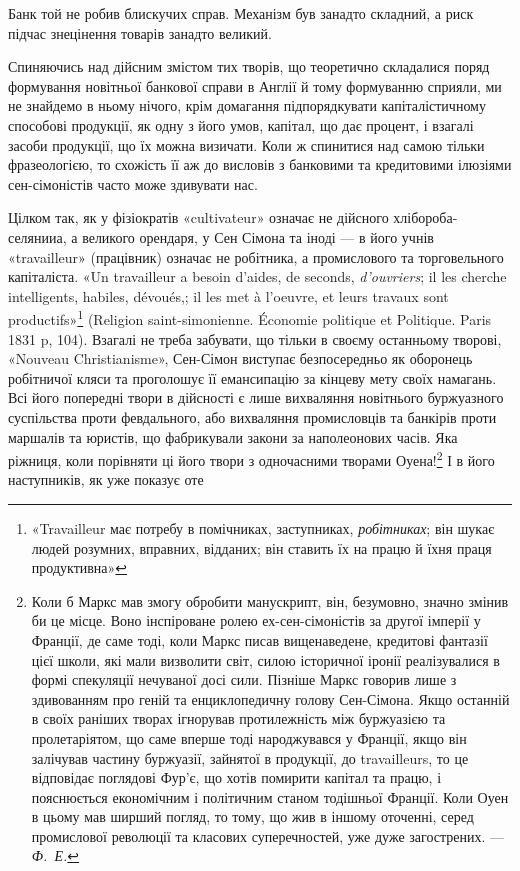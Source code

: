 \parcont{}  %
Банк той не робив блискучих справ. Механізм був занадто складний, а риск
підчас знецінення товарів занадто великий.

Спиняючись над дійсним змістом тих творів, що теоретично складалися
поряд формування новітньої банкової справи в Англії й тому формуванню
сприяли, ми не знайдемо в ньому нічого, крім домагання підпорядкувати
капіталістичному способові продукції, як одну з його умов, капітал, що дає процент,
і взагалі засоби продукції, що їх можна визичати. Коли ж спинитися над
самою тільки фразеологією, то схожість її аж до висловів з банковими та кредитовими
ілюзіями сен-сімоністів часто може здивувати нас.

Цілком так, як у фізіократів «cultivateur» означає не дійсного хлібороба-селянииа,
а великого орендаря, у Сен Сімона та іноді — в його учнів «travailleur»
(працівник) означає не робітника, а промислового та торговельного капіталіста.
«Un travailleur a besoin d’aides, de seconds, \emph{d'ouvriers}; il les cherche
intelligents, habiles, dévoués,; il les met à l’oeuvre, et leurs travaux sont productifs»\footnote*{
«Travailleur має потребу в помічниках, заступниках, \emph{робітниках}; він шукає людей розумних,
вправних, відданих; він ставить їх на працю й їхня праця продуктивна» 
}
(Religion saint-simonienne. Économie politique et Politique. Paris 1831 p, 104). Взагалі
не треба забувати, що тільки в своєму останньому творові, «Nouveau Christianisme»,
Сен-Сімон виступає безпосередньо як оборонець робітничої кляси та
проголошує її емансипацію за кінцеву мету своїх намагань. Всі його попередні
твори в дійсності є лише вихваляння новітнього буржуазного суспільства проти
февдального, або вихваляння промисловців та банкірів проти маршалів та юристів,
що фабрикували закони за наполеонових часів. Яка ріжниця, коли порівняти ці його
твори з одночасними творами Оуена!\footnote{
Коли б Маркс мав змогу обробити манускрипт, він, безумовно, значно змінив би це місце.
Воно інспіроване ролею ех-сен-сімоністів за другої імперії у Франції, де саме тоді, коли Маркс
писав вищенаведене, кредитові фантазії цієї школи, які мали визволити світ, силою історичної
іронії реалізувалися в формі спекуляції нечуваної досі сили. Пізніше Маркс говорив лише з
здивованням
про геній та енциклопедичну голову Сен-Сімона. Якщо останній в своїх раніших творах ігнорував
протилежність між буржуазією та пролетаріятом, що саме вперше тоді народжувався у Франції,
якщо він залічував частину буржуазії, зайнятої в продукції, до travailleurs, то це відповідає
поглядові
Фур’є, що хотів помирити капітал та працю, і пояснюється економічним і політичним станом тодішньої
Франції. Коли Оуен в цьому мав ширший погляд, то тому, що жив в іншому оточенні, серед промислової
революції та класових суперечностей, уже дуже загострених. — \emph{Ф.~Е.}
} І в його наступників, як уже показує оте

